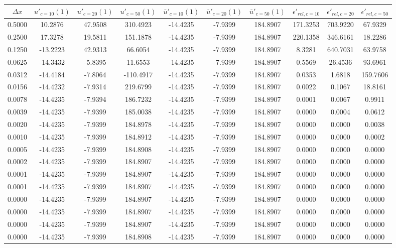 \begin{tabular}{|c|c|c|c|c|c|c|c|c|c|}
\hline
\textbf{$\Delta x$}&\textbf{$u'_{c=10}(1)$}&\textbf{$u'_{c=20}(1)$}&\textbf{$u'_{c=50}(1)$}&\textbf{$\bar{u}'_{c=10}(1)$}&\textbf{$\bar{u}'_{c=20}(1)$}&\textbf{$\bar{u}'_{c=50}(1)$}&\textbf{$\epsilon'_{rel,c=10}$}&\textbf{$\epsilon'_{rel,c=20}$}&\textbf{$\epsilon'_{rel,c=50}$}\\\hline
0.5000&10.2876&47.9508&310.4923&-14.4235&-7.9399&184.8907&171.3253&703.9220&67.9329\\\hline
0.2500&17.3278&19.5811&151.1878&-14.4235&-7.9399&184.8907&220.1358&346.6161&18.2286\\\hline
0.1250&-13.2223&42.9313&66.6054&-14.4235&-7.9399&184.8907&8.3281&640.7031&63.9758\\\hline
0.0625&-14.3432&-5.8395&11.6553&-14.4235&-7.9399&184.8907&0.5569&26.4536&93.6961\\\hline
0.0312&-14.4184&-7.8064&-110.4917&-14.4235&-7.9399&184.8907&0.0353&1.6818&159.7606\\\hline
0.0156&-14.4232&-7.9314&219.6799&-14.4235&-7.9399&184.8907&0.0022&0.1067&18.8161\\\hline
0.0078&-14.4235&-7.9394&186.7232&-14.4235&-7.9399&184.8907&0.0001&0.0067&0.9911\\\hline
0.0039&-14.4235&-7.9399&185.0038&-14.4235&-7.9399&184.8907&0.0000&0.0004&0.0612\\\hline
0.0020&-14.4235&-7.9399&184.8978&-14.4235&-7.9399&184.8907&0.0000&0.0000&0.0038\\\hline
0.0010&-14.4235&-7.9399&184.8912&-14.4235&-7.9399&184.8907&0.0000&0.0000&0.0002\\\hline
0.0005&-14.4235&-7.9399&184.8908&-14.4235&-7.9399&184.8907&0.0000&0.0000&0.0000\\\hline
0.0002&-14.4235&-7.9399&184.8907&-14.4235&-7.9399&184.8907&0.0000&0.0000&0.0000\\\hline
0.0001&-14.4235&-7.9399&184.8907&-14.4235&-7.9399&184.8907&0.0000&0.0000&0.0000\\\hline
0.0001&-14.4235&-7.9399&184.8907&-14.4235&-7.9399&184.8907&0.0000&0.0000&0.0000\\\hline
0.0000&-14.4235&-7.9399&184.8907&-14.4235&-7.9399&184.8907&0.0000&0.0000&0.0000\\\hline
0.0000&-14.4235&-7.9399&184.8907&-14.4235&-7.9399&184.8907&0.0000&0.0000&0.0000\\\hline
0.0000&-14.4235&-7.9399&184.8907&-14.4235&-7.9399&184.8907&0.0000&0.0000&0.0000\\\hline
0.0000&-14.4235&-7.9399&184.8908&-14.4235&-7.9399&184.8907&0.0000&0.0000&0.0000\\\hline
\end{tabular}
